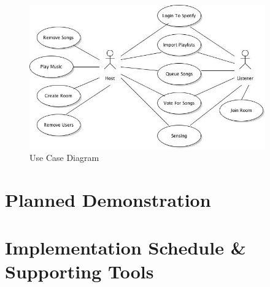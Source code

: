 \documentclass[12pt]{article}
\begin{document}
\begin{figure}[htb!]
  \centering
  \includegraphics[width=4in]{usecase-diagram}
  \caption {Use Case Diagram}
\end{figure}


\pagebreak

\section{Planned Demonstration}

\pagebreak

\section{Implementation Schedule \& Supporting Tools}
\end{document}
